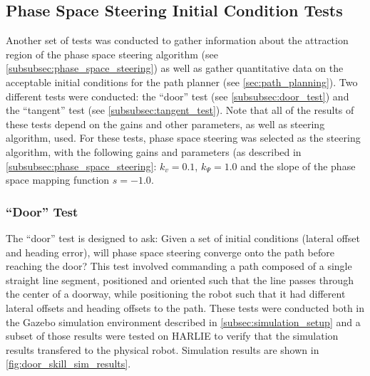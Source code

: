 \subsection{Phase Space Steering Initial Condition Tests}\label{subsec:phase_space_steering_skills}

Another set of tests was conducted to gather information about the attraction region of the phase space steering algorithm (see \autoref{subsubsec:phase_space_steering}) as well as gather quantitative data on the acceptable initial conditions for the path planner (see \autoref{sec:path_planning}). Two different tests were conducted: the ``door'' test (see \autoref{subsubsec:door_test}) and the ``tangent'' test (see \autoref{subsubsec:tangent_test}). Note that all of the results of these tests depend on the gains and other parameters, as well as steering algorithm, used. For these tests, phase space steering was selected as the steering algorithm, with the following gains and parameters (as described in \autoref{subsubsec:phase_space_steering}: $k_v = 0.1$, $k_\Psi = 1.0$ and the slope of the phase space mapping function $s = -1.0$.

\subsubsection{``Door'' Test}\label{subsubsec:door_test}

The ``door'' test is designed to ask: Given a set of initial conditions (lateral offset and heading error), will phase space steering converge onto the path before reaching the door? This test involved commanding a path composed of a single straight line segment, positioned and oriented such that the line passes through the center of a doorway, while positioning the robot such that it had different lateral offsets and heading offsets to the path. These tests were conducted both in the Gazebo simulation environment described in \autoref{subsec:simulation_setup} and a subset of those results were tested on HARLIE to verify that the simulation results transfered to the physical robot. Simulation results are shown in \autoref{fig:door_skill_sim_results}.

